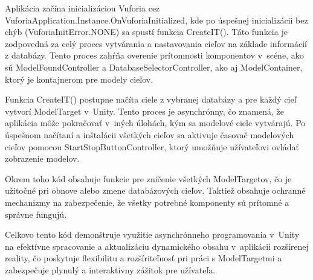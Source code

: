 Aplikácia začína inicializáciou Vuforia cez VuforiaApplication.Instance.OnVuforiaInitialized, kde po úspešnej inicializácii bez chýb (VuforiaInitError.NONE) sa spustí funkcia CreateIT(). Táto funkcia je zodpovedná za celý proces vytvárania a nastavovania cieľov na základe informácií z databázy. Tento proces zahŕňa overenie prítomnosti komponentov v~scéne, ako sú ModelFoundController a DatabaseSelectorController, ako aj ModelContainer, ktorý je kontajnerom pre modely cieľov.

Funkcia CreateIT() postupne načíta ciele z vybranej databázy a pre každý cieľ vytvorí ModelTarget v~Unity. Tento proces je asynchrónny, čo znamená, že aplikácia môže pokračovať v~iných úlohách, kým sa modelové ciele vytvárajú. Po úspešnom načítaní a inštalácii všetkých cieľov sa aktivuje časovač modelových cieľov pomocou StartStopButtonController, ktorý umožňuje užívateľovi ovládať zobrazenie modelov.

Okrem toho kód obsahuje funkcie pre zničenie všetkých ModelTargetov, čo je užitočné pri obnove alebo zmene databázových cieľov. Taktiež obsahuje ochranné mechanizmy na zabezpečenie, že všetky potrebné komponenty sú prítomné a správne fungujú.

Celkovo tento kód demonštruje využitie asynchrónneho programovania v~Unity na efektívne spracovanie a aktualizáciu dynamického obsahu v~aplikácii rozšírenej reality, čo poskytuje flexibilitu a rozšíriteľnosť pri práci s ModelTargetmi a zabezpečuje plynulý a interaktívny zážitok pre užívateľa.

